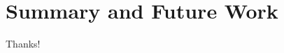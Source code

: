 \documentclass{beamer}
\begin{document}
%    
%    


\section{Summary and Future Work}


\begin{frame}
    \begin{center}
        {\Huge\calligra Thanks!}
    \end{center}
\end{frame}
\end{document}
